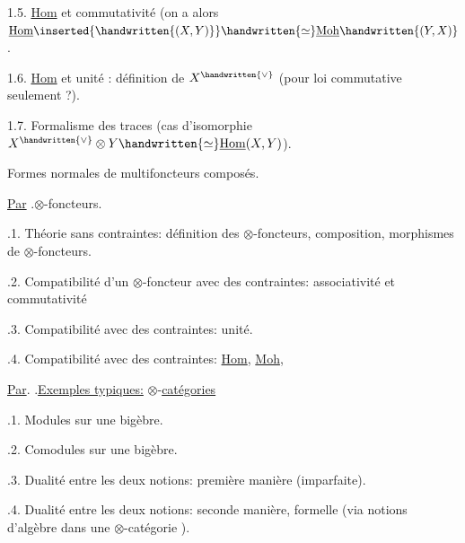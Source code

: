 1.5. \uline{Hom} et commutativité (on a alors $\underline{\mathrm{Hom}}\inserted{\handwritten{(X,Y)}}\handwritten{\simeq}\underline{\mathrm{Moh}}\handwritten{(Y,X)}$\handwritten{)}.\handwritten{---}


1.6. \uline{Hom} et unité : définition de $X^{\handwritten{\vee}}$ (pour loi commutative seulement ?).

1.7.  \handwritten{(}Formalisme des traces (cas  d'isomorphie $X^{\handwritten{\vee}}\otimes Y\handwritten{\simeq}\underline{\mathrm{Hom}}(X,Y)$).

  Formes normales de multifoncteurs composés. 

\uline{Par} .\qquad $\otimes$-foncteurs.

.1. Théorie sans contraintes: définition des $\otimes$-foncteurs, composition, morphismes de $\otimes$-foncteurs.

.2. Compatibilité d'un $\otimes$-foncteur avec des contraintes: associativité et commutativité\handwritten{!}

.3. Compatibilité avec des contraintes: unité.

.4. Compatibilité avec des contraintes: \uline{Hom}, \uline{Moh}, 


\uline{Par}. .\qquad \uline{Exemples typiques:} $\otimes$-\uline{catégories}


.1. Modules sur une bigèbre.

.2. Comodules sur une bigèbre.

.3. Dualité entre les deux notions: première manière (imparfaite).

.4. Dualité entre les deux notions: seconde manière, formelle (via  notions d'algèbre dans une $\otimes$-catégorie ).

